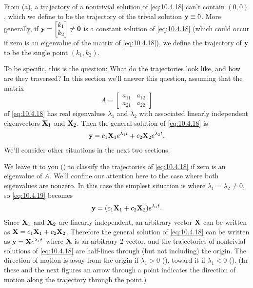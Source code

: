 From (a), a trajectory of a nontrivial
solution
of \eqref{eq:10.4.18} can't contain $(0,0)$, which we define to be the
trajectory of the trivial solution $\mathbf{y}\equiv0$. More generally,
if $\mathbf{y}=\begin{bmatrix}k_1\\k_2\end{bmatrix}\ne\mathbf{0}$ is a constant solution
of \eqref{eq:10.4.18} (which could occur if zero is an eigenvalue of the
matrix of \eqref{eq:10.4.18}), we define the trajectory of $\mathbf{y}$ to be
the single point $(k_1,k_2)$.

To be specific, this is the question: What do the trajectories look
like, and how are they traversed? In this section we'll answer this
question, assuming that the matrix
\[
A=\begin{bmatrix}a_{11}&a_{12}\\a_{21}&a_{22}\end{bmatrix}
\]
of \eqref{eq:10.4.18} has real eigenvalues $\lambda_1$ and $\lambda_2$ with
associated linearly independent eigenvectors $\mathbf{X}_1$ and $\mathbf{X}_2$. Then  the general solution of \eqref{eq:10.4.18} is
\begin{equation} \label{eq:10.4.19}
\mathbf{y}= c_1\mathbf{X}_1
 e^{\lambda_1 t}+c_2\mathbf{X}_2e^{\lambda_2 t}.
\end{equation}
We'll consider other situations in the next two sections.

We leave it to you () to classify the
trajectories of \eqref{eq:10.4.18} if zero is an eigenvalue of $A$. We'll
confine our attention here to the case where both eigenvalues are
nonzero. In this case the simplest situation is where
$\lambda_1=\lambda_2\ne0$, so  \eqref{eq:10.4.19} becomes
\[
\mathbf{y}=(c_1\mathbf{X}_1+c_2\mathbf{X}_2)e^{\lambda_1 t}.
\]
Since $\mathbf{X}_1$ and
$\mathbf{X}_2$ are linearly independent, an arbitrary vector $\mathbf{X}$
can be written as $\mathbf{X}=c_1\mathbf{X}_1+c_2\mathbf{X}_2$. Therefore the
general solution of \eqref{eq:10.4.18} can be written as $\mathbf{y}=\mathbf{X}e^{\lambda_1 t}$ where $\mathbf{X}$ is an arbitrary $2$-vector, and the
trajectories of nontrivial solutions of \eqref{eq:10.4.18} are half-lines
through (but not including) the origin. The direction of motion is
away from the origin if $\lambda_1>0$ (),
toward it if $\lambda_1<0$ (). (In these
and the next figures an arrow through a point indicates the
direction of motion along the trajectory through the point.)

